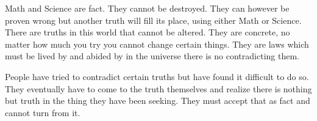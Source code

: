 Math and Science are fact. They cannot be destroyed. They can however be proven
wrong but another truth will fill its place, using either Math or Science. There
are truths in this world that cannot be altered. They are concrete, no matter
how much you try you cannot change certain things. They are laws which must be
lived by and abided by in the universe there is no contradicting them.

People have tried to contradict certain truths but have found it difficult to do
so. They eventually have to come to the truth themselves and realize there is
nothing but truth in the thing they have been seeking. They must accept that as
fact and cannot turn from it.